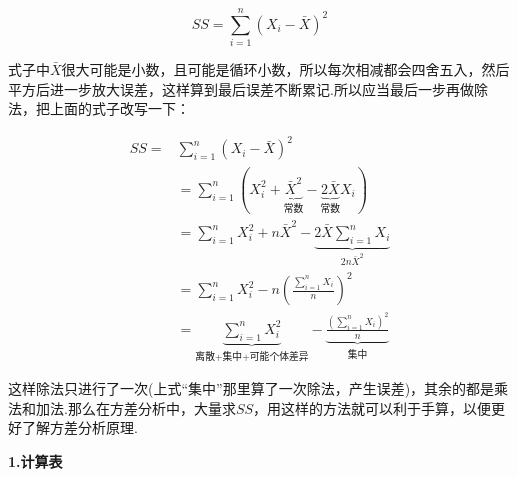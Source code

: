 $$
    SS =
        \sum\limits_{i=1}^{n}
        \left( 
            X_i -\bar{X} 
        \right)^2
$$

式子中$\bar{X}$很大可能是小数，且可能是循环小数，所以每次相减都会四舍五入，然后平方后进一步放大误差，这样算到最后误差不断累记.所以应当最后一步再做除法，把上面的式子改写一下：

\begin{align*}
SS= & \sum\limits_{i=1}^n{\left( X_i-\bar{X} \right) ^2}
\\
    & =\sum\limits_{i=1}^n{\left( X_{i}^{2}+\underset{\text{常数}}{\underbrace{\bar{X}^2}}-\underset{\text{常数}}{\underbrace{2\bar{X}}}X_i \right)}
\\
    & =\sum\limits_{i=1}^n{X_{i}^{2}}+n\bar{X}^2-\underset{2n\bar{X}^2}{\underbrace{2\bar{X}\sum\limits_{i=1}^n{X_i}}}
\\
    & =\sum\limits_{i=1}^n{X_{i}^{2}}-n\left( \frac{\sum\limits_{i=1}^n{X_i}}{n} \right) ^2
\\
    &= \underset{\text{离散+集中+可能个体差异}}{\underbrace{\sum\limits_{i=1}^n{X_{i}^{2}}}}-\underset{\text{集中}}{\underbrace{\frac{\left( \sum\limits_{i=1}^n{X_i} \right) ^2}{n}}}
\end{align*}

这样除法只进行了一次(上式“集中”那里算了一次除法，产生误差)，其余的都是乘法和加法.那么在方差分析中，大量求$SS$，用这样的方法就可以利于手算，以便更好了解方差分析原理.


\textbf{1.计算表}

